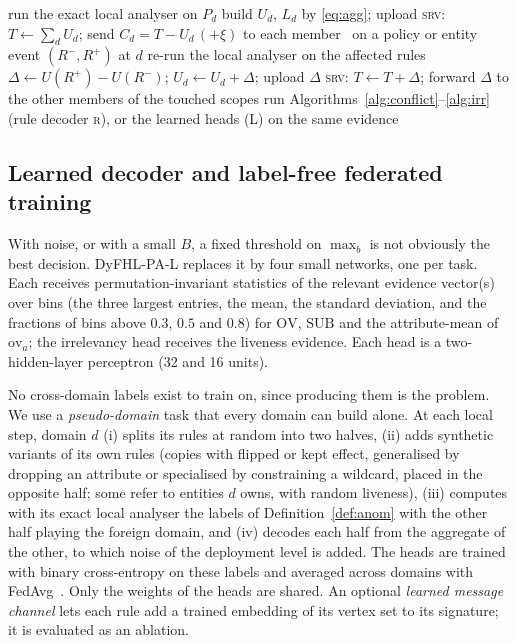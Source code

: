 \documentclass[preprint,12pt]{elsarticle}
\theoremstyle{definition}
\newcommand{\name}{DyFHL-PA\xspace}
\newcommand{\R}{\textsc{r}}
\begin{document}
\begin{algorithm}[t]
\caption{\name at domain $d$ (server steps marked \textsc{srv})}
\label{alg:dyfhl}
\begin{algorithmic}[1]
\State run the exact local analyser on $P_d$ 
\State build $U_d$, $L_d$ by \eqref{eq:agg}; upload 
\State \textsc{srv}: $T\gets\sum_{d}U_d$; send $C_d=T-U_d\,(+\xi)$ to each member
\Loop\ on a policy or entity event $(R^-,R^+)$ at $d$
  \State re-run the local analyser on the affected rules
  \State $\Delta\gets U(R^+)-U(R^-)$; $U_d\gets U_d+\Delta$; upload $\Delta$ 
  \State \textsc{srv}: $T\gets T+\Delta$; forward $\Delta$ to the other members of the touched scopes
\EndLoop
{}
  \State run Algorithms~\ref{alg:conflict}--\ref{alg:irr} (rule decoder \R), or the learned heads (L) on the same evidence
\EndFor
\end{algorithmic}
\end{algorithm}

\subsection{Learned decoder and label-free federated training}
\label{sec:learn}
With noise, or with a small $B$, a fixed threshold on $\max_b$ is not obviously the best decision. \name-L replaces it by four small networks, one per task. Each receives permutation-invariant statistics of the relevant evidence vector(s) over bins (the three largest entries, the mean, the standard deviation, and the fractions of bins above $0.3$, $0.5$ and $0.8$) for $\mathrm{OV}$, $\mathrm{SUB}$ and the attribute-mean of $\mathrm{ov}_a$; the irrelevancy head receives the liveness evidence. Each head is a two-hidden-layer perceptron (32 and 16 units).

No cross-domain labels exist to train on, since producing them is the problem. We use a \emph{pseudo-domain} task that every domain can build alone. At each local step, domain $d$ (i) splits its rules at random into two halves, (ii) adds synthetic variants of its own rules (copies with flipped or kept effect, generalised by dropping an attribute or specialised by constraining a wildcard, placed in the opposite half; some refer to entities $d$ owns, with random liveness), (iii) computes with its exact local analyser the labels of Definition~\ref{def:anom} with the other half playing the foreign domain, and (iv) decodes each half from the aggregate of the other, to which noise of the deployment level is added. The heads are trained with binary cross-entropy on these labels and averaged across domains with FedAvg~\cite{mcmahan2017communication}. Only the weights of the heads are shared. An optional \emph{learned message channel} lets each rule add a trained embedding of its vertex set to its signature; it is evaluated as an ablation.
\end{document}
